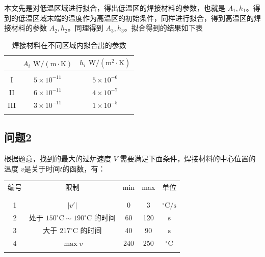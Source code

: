 \documentclass[../main.tex]{subfiles}
\begin{document}
本文先是对低温区域进行拟合，得出低温区的焊接材料的参数，也就是 \(A_{1}, h_{1}\)。得到的低温区域末端的温度作为高温区的初始条件，同样进行拟合，得到高温区的焊接材料的参数 \(A_{2}, h_{2}\)。同理得到 \(A_{3}, h_{3}\)。拟合得到的结果如下表
\begin{table}[H]
\centering
\begin{tabular}{ccc}
& \(A_{i}\) \(\mathrm{W}/ (\mathrm{m}\cdot \mathrm{K})\) & \(h_{i}\) \(\mathrm{W} / (\mathrm{m}^{2} \cdot \mathrm{K})\) \\ \hline \hline
\\[-1em]
I & \(5 \times 10 ^{-11}\) & \(5 \times 10 ^{-6}\) \\
II & \(6 \times 10 ^{-11}\) & \(4 \times 10 ^{-7}\) \\
III & \(3 \times 10 ^{-11}\) & \(1 \times 10 ^{-5}\)
\\[-1em]
\\ \hline
\end{tabular}\caption{焊接材料在不同区域内拟合出的参数}
\end{table}

\subsection{问题2}
根据题意，找到的最大的过炉速度 \(V\) 需要满足下面条件，焊接材料的中心位置的温度 \(v\)是关于时间\(t\)的函数，有：

\begin{table}[H]
\centering
\begin{tabular}{ccccc}
编号&限制 & min & max 	& 单位
\\ [-1em]
\\ \hline \hline
\\ [-1em]
1&\(\vert v '\vert\) & 0 & 3 & \(^{\circ}\mathrm{C} / \mathrm{s}\)\\
2&处于 \(150 ^{\circ}\mathrm{C}\sim 190 ^{\circ}\mathrm{C}\) 的时间 & 60 & 120 & \(\mathrm{s}\)\\
3&大于 \(217 ^{\circ}\mathrm{C}\) 的时间 & 40 & 90 & \(\mathrm{s}\)\\
4&\(\max {v}\) & 240 & 250 & \(^{\circ}\mathrm{C}\)
\\ [-1em]
\\ \hline
\end{tabular}
\end{table}
\end{document}
